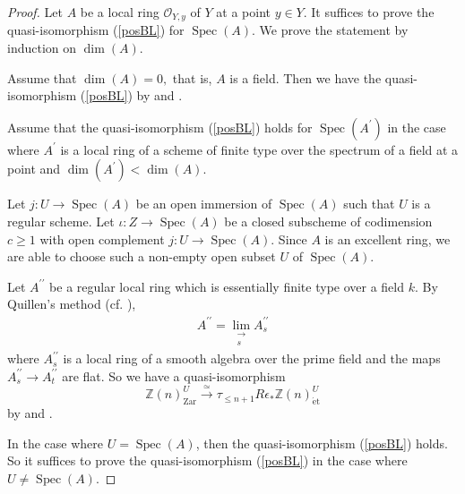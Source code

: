 \documentclass{article}
\newcommand{\spec}{\operatorname{Spec}}
\newcommand{\et}{\mathrm{\acute{e}t}}
\newcommand{\Zar}{\mathrm{Zar}}
\begin{document}
%
\begin{proof}\upshape
Let $A$ be a local ring $\mathcal{O}_{Y, y}$ of $Y$
at a point $y\in Y$. It suffices to prove the quasi-isomorphism (\ref{posBL}) for 
$\spec(A)$. We prove the statement by induction on
$\operatorname{dim}(A)$.

Assume that
%
\begin{math}
\operatorname{dim}(A)
=0,
\end{math}
%
that is,
$A$ is a field. Then we have the quasi-isomorphism 
(\ref{posBL}) by \cite[p.774, Theorem 1.2.2]{Ge} and \cite{V2}.

Assume that the quasi-isomorphism (\ref{posBL}) holds for
$\spec(A^{\prime})$
in the case where $A^{\prime}$ is a local ring of 
a scheme of finite type over the spectrum of a field
at a point
and
%
\begin{math}
\operatorname{dim}(A^{\prime})
<
\operatorname{dim}(A).
\end{math}
%

Let 
$j: U\to \spec(A)$ be an open immersion of $\spec(A)$
such that $U$ is a regular scheme.
Let $\iota: Z\to \spec(A)$ be a closed subscheme of
codimension $c\geq 1$ with open complement 
$j: U\to \spec(A)$.
Since $A$ is an excellent ring, we are able to
choose such a non-empty open subset $U$ of $\spec(A)$.

Let $A^{\prime\prime}$ be a regular local ring which is essentially finite type
over a field $k$. By Quillen's method (cf. \cite[\S 7, The proof of Theorem 5.11]{Q}),
%
\begin{align*}
A^{\prime\prime}
=
\lim_{\substack{\to  \\ s}}
A^{\prime\prime}_{s}
\end{align*}
%
where $A^{\prime\prime}_{s}$ is a local ring of a 
smooth algebra over the prime field and the maps
$A^{\prime\prime}_{s}\to A^{\prime\prime}_{t}$
are flat. So we have a quasi-isomorphism
%
\begin{equation}\label{UBL}
\mathbb{Z}(n)^{U}_{\Zar}
\xrightarrow{\simeq}
\tau_{\leq n+1}R\epsilon_{*}\mathbb{Z}(n)^{U}_{\et}
\end{equation}
%
by \cite[p.774, Theorem 1.2.2]{Ge} and \cite{V2}.

In the case where
$U=\spec(A)$, then the quasi-isomorphism (\ref{posBL}) holds. 
So it suffices to prove the quasi-isomorphism (\ref{posBL})
in the case where $U\neq \spec(A)$.


\end{proof}
\end{document}
